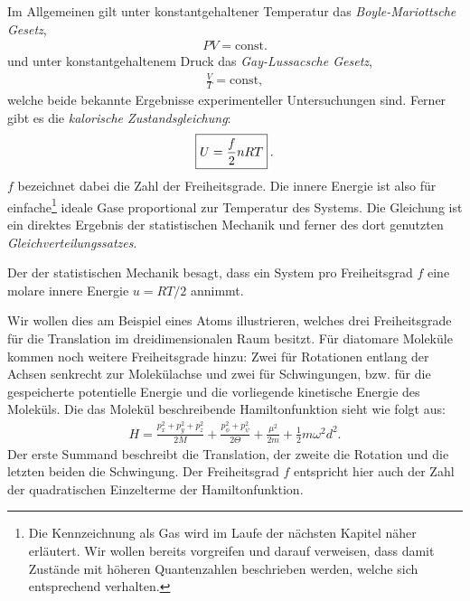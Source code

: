 Im Allgemeinen gilt unter konstantgehaltener Temperatur das \emph{Boyle-Mariottsche Gesetz},
\begin{align*}
    PV=\mathrm{const}. 
\end{align*}
und unter konstantgehaltenem Druck das \emph{Gay-Lussacsche Gesetz},
\begin{align*}
    \frac{V}{T}=\mathrm{const},
\end{align*}
welche beide bekannte Ergebnisse experimenteller Untersuchungen sind.
Ferner gibt es die \emph{kalorische Zustandsgleichung}:
\begin{align}
    \label{eq:kalorische Zustandsgleichung}
    \boxed{U=\frac{f}{2}n RT}\:.
\end{align}
$f$ bezeichnet dabei die Zahl der Freiheitsgrade. Die innere Energie ist also für einfache\footnote{Die Kennzeichnung als  Gas wird im Laufe der nächsten Kapitel näher erläutert. Wir wollen bereits vorgreifen und darauf verweisen, dass damit Zustände mit höheren Quantenzahlen beschrieben werden, welche sich entsprechend  verhalten.} ideale Gase proportional zur Temperatur des Systems.
Die Gleichung ist ein direktes Ergebnis der statistischen Mechanik und ferner des dort genutzten \emph{Gleichverteilungssatzes}.
\begin{formal}
    Der  der statistischen Mechanik besagt, dass ein System pro Freiheitsgrad $f$ eine molare innere Energie $u=RT/2$ annimmt.
\end{formal}
Wir wollen dies am Beispiel eines Atoms illustrieren, welches drei Freiheitsgrade für die Translation im dreidimensionalen Raum besitzt. Für diatomare Moleküle kommen noch weitere Freiheitsgrade hinzu: Zwei für Rotationen entlang der Achsen senkrecht zur Molekülachse und zwei für Schwingungen, bzw. für die gespeicherte potentielle Energie und die vorliegende kinetische Energie des Moleküls.
Die das Molekül beschreibende Hamiltonfunktion sieht wie folgt aus:
\begin{align*}
    H=\frac{p_x^2+p_y^2+p_z^2}{2M}+\frac{p_{\phi}^2+p_{\psi}^2}{2\Theta}+\frac{\mu^2}{2m}+\frac{1}{2}m\omega^2d^2.
\end{align*}
Der erste Summand beschreibt die Translation, der zweite die Rotation und die letzten beiden die Schwingung.
Der Freiheitsgrad $f$ entspricht hier auch der Zahl der quadratischen Einzelterme der Hamiltonfunktion.


